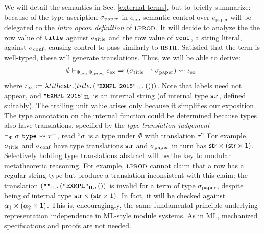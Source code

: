 We will detail the semantics in Sec. \ref{external-terms}, but to briefly summarize: because of the type ascription $\stx{paper}$ in $e_\text{ex}$, semantic control over $e_\text{paper}$ will be delegated to the \emph{intro opcon definition} of $\tcvar{lprod}$. It will decide to analyze the the row value of $\conclbl{title}$ against $\stx{title}$ and the row value of $\conclbl{conf}$, a string literal, against $\stx{conf}$, causing control to pass similarly to $\tcvar{rstr}$. Satisfied that the term is well-typed, these will generate translations. Thus, we will be able to derive:
\[\hspace{-5px}\begin{array}{l}\esyn{\emptyset}{\Phi_\text{rstr}\Phi_\text{lprod}}{e_\text{ex}}{(\stx{title}\rightharpoonup\stx{paper})}{\iota_\text{ex}}\end{array}\]
where $\small\iota_\text{ex} := \ilam{\keyw{str}}{title}{(title, (\texttt{"EXMPL 2015"}_\text{IL}, ()))}$. Note that labels need not appear, and $\small\texttt{"EXMPL 2015"}_\text{IL}$ is an internal string (of internal type $\keyw{str}$, defined suitably). The trailing unit value arises only because it simplifies our exposition. The type annotation on the internal function could be determined because types also have translations, specified by the \emph{type translation judgement} $\vdash_\Phi \st~\mathtt{type} \leadsto \tau\moutput$, read ``$\st$ is a type under $\Phi$ with translation $\tau$''. For example, $\stx{title}$  and $\stx{conf}$ have type translations  $\keyw{str}$ and  $\stx{paper}$ in turn has $\keyw{str}\times(\keyw{str}\times\kunit)$. Selectively holding type translations abstract will be the key to modular metatheoretic reasoning. For example, $\tcvar{lprod}$ cannot claim that a row has a regular string type but produce a translation inconsistent with this claim: the translation $(\concstr{}_\text{IL}, (\concstr{EXMPL}_\text{IL}, ())$ is invalid for a term of type $\stx{paper}$, despite being of internal type $\keyw{str}\times(\keyw{str}\times\kunit)$. In fact, it will be checked against $\alpha_1 \times (\alpha_2 \times \kunit)$. This is, encouragingly, the same fundamental principle underlying representation independence in ML-style module systems. As in ML, mechanized specifications and proofs are not needed.

